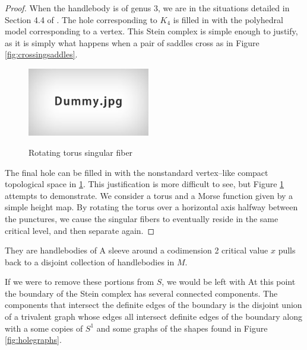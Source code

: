 \begin{proof}
													When the handlebody is of genus 3, we are in the situations detailed in Section 4.4 of \cite{CostThur08}.
													The hole corresponding to $K_4$ is filled in with the polyhedral model corresponding to a vertex.
													This Stein complex is simple enough to justify, as it is simply what happens when a pair of saddles cross as in Figure \ref{fig:crossingsaddles}.
													
													\begin{figure}
														\centering
														\captionsetup{justification=centering}
														\caption{Rotating torus singular fiber}
														\includegraphics[height=3cm]{figures/dummy.jpg}
														\label{fig:doublecone}
													\end{figure}
													
													The final hole can be filled in with the nonstandard vertex--like compact topological space in \ref{fig:doublecone}.
													This justification is more difficult to see, but Figure \ref{fig:doublecone} attempts to demonstrate.
													We consider a torus and a Morse function given by a simple height map.
													By rotating the torus over a horizontal axis halfway between the punctures, we cause the singular fibers to eventually reside in the same critical level, and then separate again.
													
													
													
													
													
													
													
													
													
													
													
													
												\end{proof}
												
												
												
													
													They are handlebodies of 
													A sleeve around a codimension 2 critical value $x$ pulls back to a disjoint collection of handlebodies in $M$.
													
													If we were to remove these portions from $S$, we would be left with 
													At this point the boundary of the Stein complex has several connected components.
													The components that intersect the definite edges of the boundary 
													is the disjoint union of a trivalent graph whose edges all intersect definite edges of the boundary along with a some copies of $S^1$ and some graphs of the shapes found in Figure \ref{fig:holegraphs}.
												
